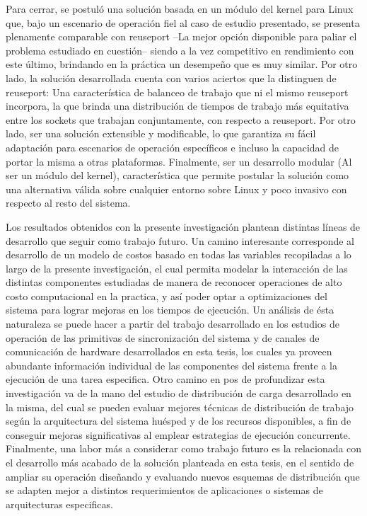 \begin{conclusion}
 
Para cerrar, se postuló una solución basada en un módulo del kernel para Linux que, bajo un escenario de operación fiel al caso de estudio presentado, se presenta plenamente comparable con reuseport --La mejor opción disponible para paliar el problema estudiado en cuestión-- siendo a la vez competitivo en rendimiento con este último, brindando en la práctica un desempeño que es muy similar. Por otro lado, la solución desarrollada cuenta con varios aciertos que la distinguen de reuseport: Una característica de balanceo de trabajo que ni el mismo reuseport incorpora, la que brinda una distribución de tiempos de trabajo más equitativa entre los sockets que trabajan conjuntamente, con respecto a reuseport. Por otro lado, ser una solución extensible y modificable, lo que garantiza su fácil adaptación para escenarios de operación específicos e incluso la capacidad de portar la misma a otras plataformas. Finalmente, ser un desarrollo modular (Al ser un módulo del kernel), característica que permite postular la solución como una alternativa válida sobre cualquier entorno sobre Linux y poco invasivo con respecto al resto del sistema.


Los resultados obtenidos con la presente investigación plantean distintas líneas de desarrollo que seguir como trabajo futuro. Un camino interesante corresponde al desarrollo de un modelo de costos basado en todas las variables recopiladas a lo largo de la presente investigación, el cual permita modelar la interacción de las distintas componentes estudiadas de manera de reconocer operaciones de alto costo computacional en la practica, y así poder optar a optimizaciones del sistema para lograr mejoras en los tiempos de ejecución. Un análisis de ésta naturaleza se puede hacer a partir del trabajo desarrollado en los estudios de operación de las primitivas de sincronización del sistema y de canales de comunicación de hardware desarrollados en esta tesis, los cuales ya proveen abundante información individual de las componentes del sistema frente a la ejecución de una tarea especifica. Otro camino en pos de profundizar esta investigación va de la mano del estudio de distribución de carga desarrollado en la misma, del cual se pueden evaluar mejores técnicas de distribución de trabajo según la arquitectura del sistema huésped y de los recursos disponibles, a fin de conseguir mejoras significativas al emplear estrategias de ejecución concurrente. Finalmente, una labor más a considerar como trabajo futuro es la relacionada con el desarrollo más acabado de la solución planteada en esta tesis, en el sentido de ampliar su operación diseñando y evaluando nuevos esquemas de distribución que se adapten mejor a distintos requerimientos de aplicaciones o sistemas de arquitecturas especificas.

\end{conclusion}